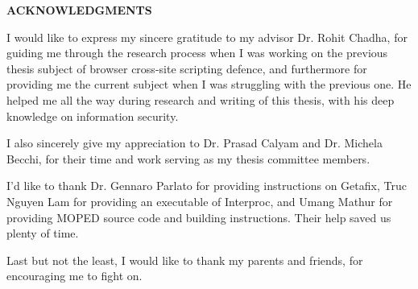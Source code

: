 \newpage
{}
\setcounter{page}{2}

\centerline{\bf \large ACKNOWLEDGMENTS}
\vskip 10mm %
I would like to express my sincere gratitude to my advisor Dr. Rohit Chadha, for guiding me through the research process when I was working on the previous thesis subject of browser cross-site scripting defence, and furthermore for providing me the current subject when I was struggling with the previous one. He helped me all the way during research and writing of this thesis, with his deep knowledge on information security.

I also sincerely give my appreciation to Dr. Prasad Calyam and Dr. Michela Becchi, for their time and work serving as my thesis committee members.

I'd like to thank Dr. Gennaro Parlato for providing instructions on Getafix, Truc Nguyen Lam for providing an executable of Interproc, and Umang Mathur for providing MOPED source code and building instructions. Their help saved us plenty of time. 

Last but not the least, I would like to thank my parents and friends, for encouraging me to fight on.
